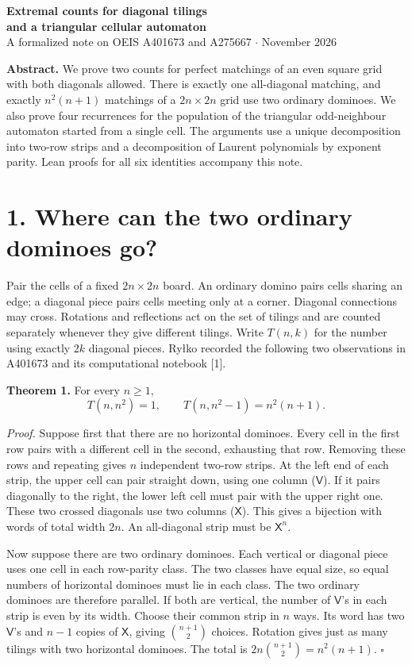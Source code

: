 \documentclass[12pt,a4paper]{article}
\newcommand{\stmt}[1]{\textbf{\color{accent}#1}\enspace}
\newcommand{\V}{\mathsf V}\newcommand{\X}{\mathsf X}
\begin{document}
\begin{center}
{\LARGE\bfseries\color{ink} Extremal counts for diagonal tilings\\[3pt]
and a triangular cellular automaton}\\[7pt]
{\small A formalized note on OEIS A401673 and A275667 \quad$\cdot$ November 2026}
\end{center}

\stmt{Abstract.} We prove two counts for perfect matchings of an even square grid with both diagonals allowed. There is exactly one all-diagonal matching, and exactly $n^2(n+1)$ matchings of a $2n\times2n$ grid use two ordinary dominoes. We also prove four recurrences for the population of the triangular odd-neighbour automaton started from a single cell. The arguments use a unique decomposition into two-row strips and a decomposition of Laurent polynomials by exponent parity. Lean proofs for all six identities accompany this note.

\section*{1. Where can the two ordinary dominoes go?}
Pair the cells of a fixed $2n\times2n$ board. An ordinary domino pairs cells sharing an edge; a diagonal piece pairs cells meeting only at a corner. Diagonal connections may cross. Rotations and reflections act on the set of tilings and are counted separately whenever they give different tilings. Write $T(n,k)$ for the number using exactly $2k$ diagonal pieces. Ry{\l}ko recorded the following two observations in A401673 and its computational notebook [1].

\stmt{Theorem 1.} For every $n\ge1$,
\[
 T(n,n^2)=1,\qquad T(n,n^2-1)=n^2(n+1).
\]

\textit{Proof.} Suppose first that there are no horizontal dominoes. Every cell in the first row pairs with a different cell in the second, exhausting that row. Removing these rows and repeating gives $n$ independent two-row strips. At the left end of each strip, the upper cell can pair straight down, using one column ($\V$). If it pairs diagonally to the right, the lower left cell must pair with the upper right one. These two crossed diagonals use two columns ($\X$). This gives a bijection with words of total width $2n$. An all-diagonal strip must be $\X^n$.

Now suppose there are two ordinary dominoes. Each vertical or diagonal piece uses one cell in each row-parity class. The two classes have equal size, so equal numbers of horizontal dominoes must lie in each class. The two ordinary dominoes are therefore parallel. If both are vertical, the number of $\V$'s in each strip is even by its width. Choose their common strip in $n$ ways. Its word has two $\V$'s and $n-1$ copies of $\X$, giving $\binom{n+1}{2}$ choices. Rotation gives just as many tilings with two horizontal dominoes. The total is $2n\binom{n+1}{2}=n^2(n+1)$. \hfill$\square$
\end{document}
